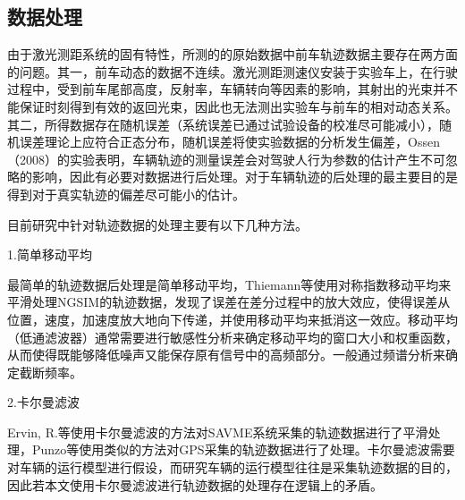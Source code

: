\subsection{数据处理}


由于激光测距系统的固有特性，所测的的原始数据中前车轨迹数据主要存在两方面的问题。其一，前车动态的数据不连续。激光测距测速仪安装于实验车上，在行驶过程中，受到前车尾部高度，反射率，车辆转向等因素的影响，其射出的光束并不能保证时刻得到有效的返回光束，因此也无法测出实验车与前车的相对动态关系。其二，所得数据存在随机误差（系统误差已通过试验设备的校准尽可能减小），随机误差理论上应符合正态分布，随机误差将使实验数据的分析发生偏差，Ossen（2008）\cite{Ossen2008}的实验表明，车辆轨迹的测量误差会对驾驶人行为参数的估计产生不可忽略的影响，因此有必要对数据进行后处理。对于车辆轨迹的后处理的最主要目的是得到对于真实轨迹的偏差尽可能小的估计。

目前研究中针对轨迹数据的处理主要有以下几种方法。

1.简单移动平均


最简单的轨迹数据后处理是简单移动平均，Thiemann等\cite{Thiemann2008}使用对称指数移动平均来平滑处理NGSIM的轨迹数据，发现了误差在差分过程中的放大效应，使得误差从位置，速度，加速度放大地向下传递，并使用移动平均来抵消这一效应。移动平均（低通滤波器）通常需要进行敏感性分析来确定移动平均的窗口大小和权重函数，从而使得既能够降低噪声又能保存原有信号中的高频部分。一般通过频谱分析来确定截断频率。


2.卡尔曼滤波

Ervin, R.等\cite{Ervin2000}使用卡尔曼滤波的方法对SAVME系统采集的轨迹数据进行了平滑处理，Punzo等\cite{Punzo2009}使用类似的方法对GPS采集的轨迹数据进行了处理。卡尔曼滤波需要对车辆的运行模型进行假设，而研究车辆的运行模型往往是采集轨迹数据的目的，因此若本文使用卡尔曼滤波进行轨迹数据的处理存在逻辑上的矛盾。

